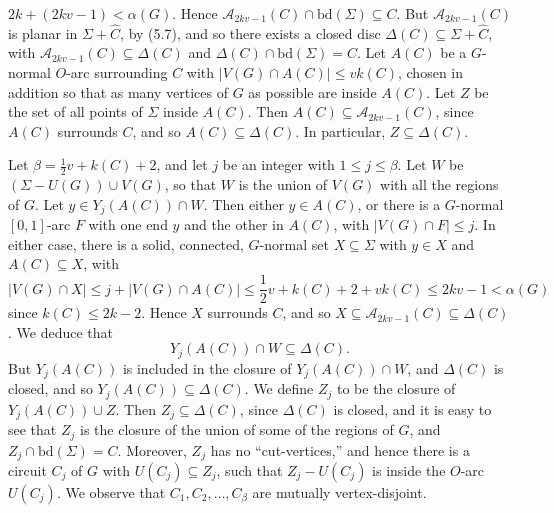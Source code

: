 \noindent $2k + (2kv - 1) < \alpha(G)$. Hence $\mathscr{A}_{2kv - 1}(C) \cap \mathrm{bd}(\Sigma) \subseteq C$. But $\mathscr{A}_{2kv - 1}(C)$ is planar in $\Sigma + \hat{C}$, by (5.7), and so there exists a closed disc $\Delta(C) \subseteq \Sigma + \hat{C}$, with $\mathscr{A}_{2kv - 1}(C) \subseteq \Delta(C)$ and $\Delta(C) \cap \mathrm{bd}(\Sigma) = C$. Let $A(C)$ be a $G$-normal $O$-arc surrounding $C$ with $|V(G) \cap A(C)| \le vk(C)$, chosen in addition so that as many vertices of $G$ as possible are inside $A(C)$. Let $Z$ be the set of all points of $\Sigma$ inside $A(C)$. Then $A(C) \subseteq \mathscr{A}_{2kv - 1}(C)$, since $A(C)$ surrounds $C$, and so $A(C) \subseteq \Delta(C)$. In particular, $Z \subseteq \Delta(C)$.

Let $\beta = \frac{1}{2}v + k(C) + 2$, and let $j$ be an integer with $1 \le j \le \beta$. Let $W$ be $(\Sigma - U(G)) \cup V(G)$, so that $W$ is the union of $V(G)$ with all the regions of $G$. Let $y \in Y_j(A(C)) \cap W$. Then either $y \in A(C)$, or there is a $G$-normal $[0, 1]$-arc $F$ with one end $y$ and the other in $A(C)$, with $|V(G) \cap F| \le j$. In either case, there is a solid, connected, $G$-normal set $X \subseteq \Sigma$ with $y \in X$ and $A(C) \subseteq X$, with
\begin{equation*}
|V(G) \cap X| \le j + |V(G) \cap A(C)| \le \frac{1}{2}v + k(C) + 2 + vk(C) \le 2kv - 1 < \alpha(G)
\end{equation*}
since $k(C) \le 2k - 2$. Hence $X$ surrounds $C$, and so $X \subseteq \mathscr{A}_{2kv - 1}(C) \subseteq \Delta(C)$. We deduce that
\begin{equation*}
Y_j(A(C)) \cap W \subseteq \Delta(C).
\end{equation*}
But $Y_j(A(C))$ is included in the closure of $Y_j(A(C)) \cap W$, and $\Delta(C)$ is closed, and so $Y_j(A(C)) \subseteq \Delta(C)$. We define $Z_j$ to be the closure of $Y_j(A(C)) \cup Z$. Then $Z_j \subseteq \Delta(C)$, since $\Delta(C)$ is closed, and it is easy to see that $Z_j$ is the closure of the union of some of the regions of $G$, and $Z_j \cap \mathrm{bd}(\Sigma) = C$. Moreover, $Z_j$ has no ``cut-vertices,'' and hence there is a circuit $C_j$ of $G$ with $U(C_j) \subseteq Z_j$, such that $Z_j - U(C_j)$ is inside the $O$-arc $U(C_j)$. We observe that $C_1, C_2, \dots, C_\beta$ are mutually vertex-disjoint.

